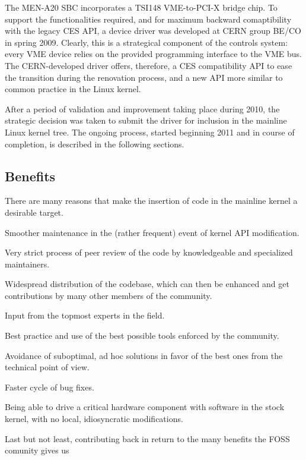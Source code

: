 \documentclass{JAC2003}
\begin{document}
The MEN-A20 SBC incorporates a TSI148 VME-to-PCI-X bridge chip.
To support the functionalities required, and for maximum backward
comaptibility with the legacy CES API, a device driver was developed 
at CERN group BE/CO in spring 2009. Clearly, this is a strategical
component of the controls system: every VME device relies on the
provided programming interface to the VME bus. The CERN-developed driver
offers, therefore, a CES compatibility API to ease the transition during
the renovation process, and a new API more similar to common practice
in the Linux kernel.

After a period of validation and improvement taking place during 2010,
the strategic decision was taken to submit the driver for
inclusion in the mainline Linux kernel tree. The ongoing process, started
beginning 2011 and in course of completion, is described in the following
sections.

\subsection{Benefits}

There are many reasons that make the insertion of code in the mainline
kernel a desirable target.

\begin{Itemize}
\item Smoother maintenance in the (rather frequent) event of kernel API
    modification.
\item Very strict process of peer review of the code by knowledgeable
    and specialized maintainers.
\item Widespread distribution of the codebase, which can then be
    enhanced and get contributions by many other members of the community.
\item Input from the topmost experts in the field.
\item Best practice and use of the best possible tools enforced by
    the community.
\item Avoidance of suboptimal, ad hoc solutions in favor of the
    best ones from the technical point of view.
\item Faster cycle of bug fixes.
\item Being able to drive a critical hardware component with software
    in the stock kernel, with no local, idiosyncratic modifications.
    \label{stock}
\item Last but not least, contributing back in return to the many
    benefits the FOSS comunity gives us
\end{Itemize}
\end{document}
